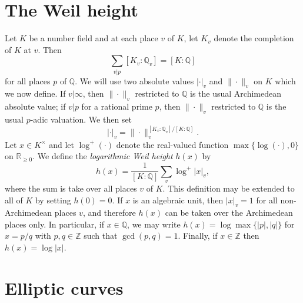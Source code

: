 \section{The Weil height}
\label{sec:WeilHeight}

Let $K$ be a number field and at each place $v$ of $K$, let $K_v$ denote the completion of $K$ at $v$. Then
\[\sum_{v|p} [K_v:\mathbb{Q}_v] = [K:\mathbb{Q}]\]
for all places $p$ of $\mathbb{Q}$. We will use two absolute values $| \cdot |_v$ and $\| \cdot \|_v$ on $K$ which we now define. If $v|\infty$, then $\| \cdot \|_v$ restricted to $\mathbb{Q}$ is the usual Archimedean absolute value; if $v|p$ for a rational prime $p$, then $\| \cdot \|_v$ restricted to $\mathbb{Q}$ is the usual $p$-adic valuation. We then set
\[ | \cdot |_v = \| \cdot \|_v^{[K_v:\mathbb{Q}_v]/[K:\mathbb{Q}]}.\]
Let $x \in K^{\times}$ and let $\log^+(\cdot)$ denote the real-valued function $\max\{\log(\cdot),0\}$ on $\mathbb{R}_{\geq 0}$. We define the \textit{logarithmic Weil height} $h(x)$ by 
\[h(x) = \frac{1}{[K:\mathbb{Q}]}\sum_v \log^+|x|_v,\]
where the sum is take over all places $v$ of $K$. This definition may be extended to all of $K$ by setting $h(0) = 0$. If $x$ is an algebraic unit, then $|x|_v = 1$ for all non-Archimedean places $v$, and therefore $h(x)$ can be taken over the Archimedean places only. 
In particular, if $x \in \mathbb{Q}$, we may write $h(x) = \log\max\{|p|,|q|\}$ for $x = p/q$ with $p,q \in \mathbb{Z}$ such that $\gcd(p,q) = 1$. Finally, if $x \in \mathbb{Z}$ then $h(x) = \log|x|$. 



\section{Elliptic curves}
\label{sec:EllipticCurves}

